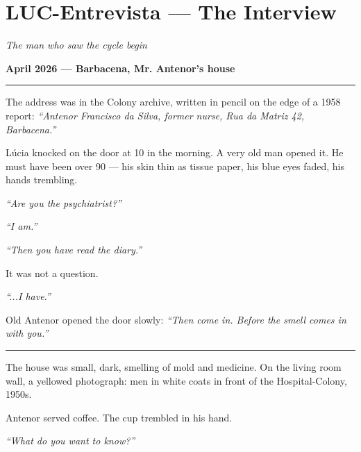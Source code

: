 \section*{\textbf{LUC-Entrevista} --- The Interview}

\noindent \textit{The man who saw the cycle begin}

\noindent \textbf{April 2026 --- Barbacena, Mr. Antenor's house}

\vspace{0.5em}\noindent\rule{\textwidth}{0.5pt}\vspace{0.5em}

\noindent The address was in the Colony archive, written in pencil on the edge of a 1958 report: \textit{\textquotedblleft{}Antenor Francisco da Silva, former nurse, Rua da Matriz 42, Barbacena.\textquotedblright{}}

\noindent Lúcia knocked on the door at 10 in the morning. A very old man opened it. He must have been over 90 --- his skin thin as tissue paper, his blue eyes faded, his hands trembling.

\noindent \textit{\textquotedblleft{}Are you the psychiatrist?\textquotedblright{}}

\noindent \textit{\textquotedblleft{}I am.\textquotedblright{}}

\noindent \textit{\textquotedblleft{}Then you have read the diary.\textquotedblright{}}

\noindent It was not a question.

\noindent \textit{\textquotedblleft{}...I have.\textquotedblright{}}

\noindent Old Antenor opened the door slowly: \textit{\textquotedblleft{}Then come in. Before the smell comes in with you.\textquotedblright{}}

\vspace{0.5em}\noindent\rule{\textwidth}{0.5pt}\vspace{0.5em}

\noindent The house was small, dark, smelling of mold and medicine. On the living room wall, a yellowed photograph: men in white coats in front of the Hospital-Colony, 1950s.

\noindent Antenor served coffee. The cup trembled in his hand.

\noindent \textit{\textquotedblleft{}What do you want to know?\textquotedblright{}}

